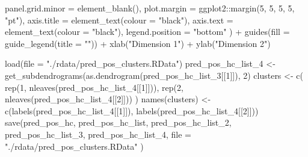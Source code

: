 \documentclass[
  11pt,
  oneside]{book}
\newenvironment{Shaded}{\begin{snugshade}}{\end{snugshade}}
\newcommand{\AttributeTok}[1]{\textcolor[rgb]{0.77,0.63,0.00}{#1}}
\newcommand{\DecValTok}[1]{\textcolor[rgb]{0.00,0.00,0.81}{#1}}
\newcommand{\FunctionTok}[1]{\textcolor[rgb]{0.00,0.00,0.00}{#1}}
\newcommand{\NormalTok}[1]{#1}
\newcommand{\OtherTok}[1]{\textcolor[rgb]{0.56,0.35,0.01}{#1}}
\newcommand{\SpecialCharTok}[1]{\textcolor[rgb]{0.00,0.00,0.00}{#1}}
\newcommand{\StringTok}[1]{\textcolor[rgb]{0.31,0.60,0.02}{#1}}
\begin{document}
\begin{Shaded}
\begin{Highlighting}[]
    \AttributeTok{panel.grid.minor =} \FunctionTok{element\_blank}\NormalTok{(),}
    \AttributeTok{plot.margin =}\NormalTok{ ggplot2}\SpecialCharTok{::}\FunctionTok{margin}\NormalTok{(}\DecValTok{5}\NormalTok{, }\DecValTok{5}\NormalTok{, }\DecValTok{5}\NormalTok{, }\DecValTok{5}\NormalTok{, }\StringTok{"pt"}\NormalTok{),}
    \AttributeTok{axis.title =} \FunctionTok{element\_text}\NormalTok{(}\AttributeTok{colour =} \StringTok{"black"}\NormalTok{),}
    \AttributeTok{axis.text =} \FunctionTok{element\_text}\NormalTok{(}\AttributeTok{colour =} \StringTok{"black"}\NormalTok{),}
    \AttributeTok{legend.position =} \StringTok{"bottom"}
\NormalTok{  ) }\SpecialCharTok{+}
  \FunctionTok{guides}\NormalTok{(}\AttributeTok{fill =} \FunctionTok{guide\_legend}\NormalTok{(}\AttributeTok{title =} \StringTok{""}\NormalTok{)) }\SpecialCharTok{+}
  \FunctionTok{xlab}\NormalTok{(}\StringTok{"Dimension 1"}\NormalTok{) }\SpecialCharTok{+}
  \FunctionTok{ylab}\NormalTok{(}\StringTok{"Dimension 2"}\NormalTok{)}
\end{Highlighting}
\end{Shaded}

\begin{Shaded}
\begin{Highlighting}[]
\FunctionTok{load}\NormalTok{(}\AttributeTok{file =} \StringTok{"./rdata/pred\_pos\_clusters.RData"}\NormalTok{)}
\NormalTok{pred\_pos\_hc\_list\_4 }\OtherTok{\textless{}{-}} \FunctionTok{get\_subdendrograms}\NormalTok{(}\FunctionTok{as.dendrogram}\NormalTok{(pred\_pos\_hc\_list\_3[[}\DecValTok{1}\NormalTok{]]), }\DecValTok{2}\NormalTok{)}
\NormalTok{clusters }\OtherTok{\textless{}{-}} \FunctionTok{c}\NormalTok{(}
  \FunctionTok{rep}\NormalTok{(}\DecValTok{1}\NormalTok{, }\FunctionTok{nleaves}\NormalTok{(pred\_pos\_hc\_list\_4[[}\DecValTok{1}\NormalTok{]])),}
  \FunctionTok{rep}\NormalTok{(}\DecValTok{2}\NormalTok{, }\FunctionTok{nleaves}\NormalTok{(pred\_pos\_hc\_list\_4[[}\DecValTok{2}\NormalTok{]]))}
\NormalTok{)}
\FunctionTok{names}\NormalTok{(clusters) }\OtherTok{\textless{}{-}} \FunctionTok{c}\NormalTok{(}\FunctionTok{labels}\NormalTok{(pred\_pos\_hc\_list\_4[[}\DecValTok{1}\NormalTok{]]), }\FunctionTok{labels}\NormalTok{(pred\_pos\_hc\_list\_4[[}\DecValTok{2}\NormalTok{]]))}
\FunctionTok{save}\NormalTok{(pred\_pos\_hc, pred\_pos\_hc\_list, pred\_pos\_hc\_list\_2, pred\_pos\_hc\_list\_3, pred\_pos\_hc\_list\_4,}
  \AttributeTok{file =} \StringTok{"./rdata/pred\_pos\_clusters.RData"}
\NormalTok{)}
\end{Highlighting}
\end{Shaded}
\end{document}
